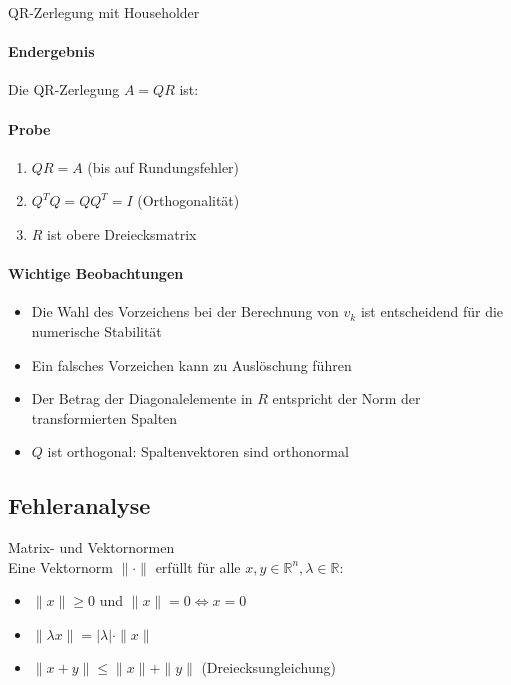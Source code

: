 \begin{example2}[breakable]{QR-Zerlegung mit Householder}
\paragraph{Endergebnis}
Die QR-Zerlegung $A = QR$ ist:
\vspace{2mm}\\

\paragraph{Probe}
\begin{enumerate}
    \item $QR = A$ (bis auf Rundungsfehler)
    \item $Q^TQ = QQ^T = I$ (Orthogonalität)
    \item $R$ ist obere Dreiecksmatrix
\end{enumerate}

\paragraph{Wichtige Beobachtungen}
\begin{itemize}
    \item Die Wahl des Vorzeichens bei der Berechnung von $v_k$ ist entscheidend für die numerische Stabilität
    \item Ein falsches Vorzeichen kann zu Auslöschung führen
    \item Der Betrag der Diagonalelemente in $R$ entspricht der Norm der transformierten Spalten
    \item $Q$ ist orthogonal: Spaltenvektoren sind orthonormal
\end{itemize}
\end{example2}

\subsection{Fehleranalyse}

\begin{definition}{Matrix- und Vektornormen}\\
Eine Vektornorm $\|\cdot\|$ erfüllt für alle $x,y \in \mathbb{R}^n, \lambda \in \mathbb{R}$:
\begin{itemize}
    \item $\|x\| \geq 0$ und $\|x\| = 0 \Leftrightarrow x = 0$
    \item $\|\lambda x\| = |\lambda| \cdot \|x\|$
    \item $\|x + y\| \leq \|x\| + \|y\|$ (Dreiecksungleichung)
\end{itemize}
\end{definition}


